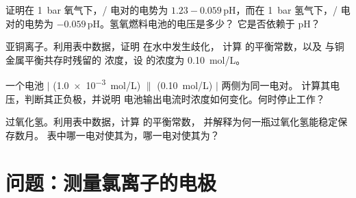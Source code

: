 \begin{exercise}[$\star\star$]\label{exo:b1:nernst:9}
证明在 \qty{1}{bar} 氧气下，/ 电对的电势为
$1.23 - 0.059\,\mathrm{pH}$，而在 \qty{1}{bar} 氢气下，/ 电对的电势为
$-0.059\,\mathrm{pH}$。氢氧燃料电池的电压是多少？
它是否依赖于 pH？
\end{exercise}

\begin{exercise}[$\star\star\star$]\label{exo:b1:nernst:10}
亚铜离子。利用表中数据，证明  在水中发生歧化，
计算  的平衡常数，以及
与铜金属平衡共存时残留的  浓度，设
 的浓度为 \qty{0.10}{mol/L}。
\end{exercise}

\begin{exercise}[$\star\star\star$]\label{exo:b1:nernst:11}
一个电池  $|$  (\qty{1.0e-3}{mol/L}) $\|$ 
(\qty{0.10}{mol/L}) $|$  两侧为同一电对。
计算其电压，判断其正负极，并说明
电池输出电流时浓度如何变化。何时停止工作？
\end{exercise}

\begin{exercise}[$\star\star\star$]\label{exo:b1:nernst:12}
过氧化氢。利用表中数据，计算
 的平衡常数，
并解释为何一瓶过氧化氢能稳定保存数月。
表中哪一电对使其为，哪一电对使其为？
\end{exercise}

\section{问题：测量氯离子的电极}

